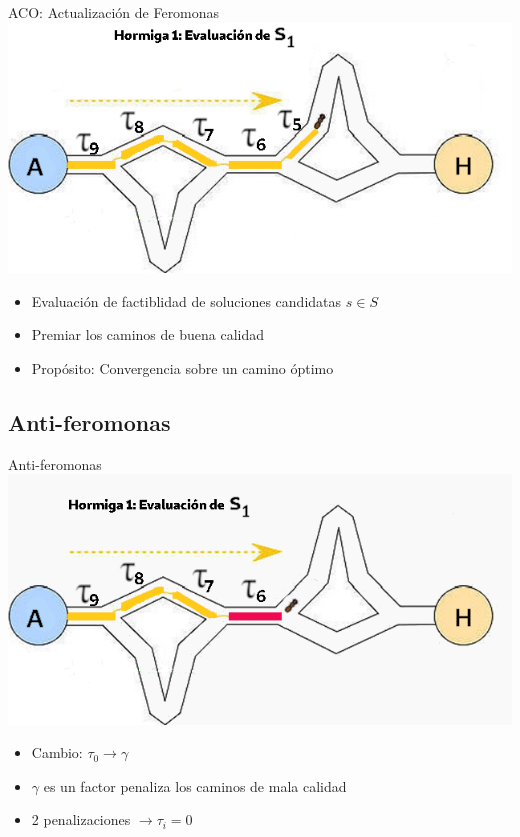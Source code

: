 \begin{frame}{ACO: Actualizaci\'on de Feromonas}
\centering
\includegraphics[scale=0.4]{Pictures/ACO-ant-ferom.png}
\begin{itemize}
    \item Evaluaci\'on de factiblidad de soluciones candidatas $s \in S$
    \item Premiar los caminos de buena calidad
    \item Prop\'osito: Convergencia sobre un camino \'optimo
\end{itemize}
\end{frame}


\subsection{Anti-feromonas}
\begin{frame}{Anti-feromonas}
\centering
\includegraphics[scale=0.4]{Pictures/ACO-ant-ferom-penalize.png}
    \begin{itemize}
        \item Cambio: $\tau_0 \longrightarrow \gamma$
        \item $\gamma$ es un factor penaliza los caminos de mala calidad
        \item 2 penalizaciones $\longrightarrow \tau_i = 0$ 
    \end{itemize}
\end{frame}


